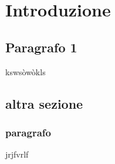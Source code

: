 \chapter{Introduzione}
\section{Paragrafo 1}
kswsòwòkls
\section{altra sezione}
\subsection{paragrafo}
jrjfvrlf